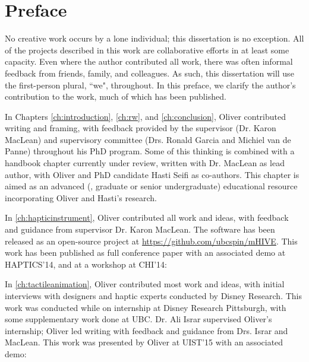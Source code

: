 
\chapter{Preface}
No creative work occurs by a lone individual; this dissertation is no exception.
All of the projects described in this work are collaborative efforts in at least some capacity.
Even where the author contributed all work, there was often informal feedback from friends, family, and colleagues.
As such, this dissertation will use the first-person plural, ``we", throughout.
In this preface, we clarify the author's contribution to the work, much of which has been published.

In Chapters \ref{ch:introduction}, \ref{ch:rw}, and \ref{ch:conclusion}, Oliver contributed writing and framing, with feedback provided by the supervisor (Dr. Karon MacLean) and supervisory committee (Drs. Ronald Garcia and Michiel van de Panne) throughout his PhD program. 
Some of this thinking  is combined with a handbook chapter currently under review, written with Dr. MacLean as lead author, with Oliver and PhD candidate Hasti Seifi as co-authors.
This chapter is aimed as an advanced (\ie, graduate or senior undergraduate) educational resource incorporating Oliver and Hasti's research.

In \autoref{ch:hapticinstrument}, Oliver contributed all work and ideas, with feedback and guidance from supervisor Dr. Karon MacLean.
The software has been released as an open-source project at \url{https://github.com/ubcspin/mHIVE}.
This work has been published as full conference paper with an associated demo at HAPTICS'14, and at a workshop at CHI'14:


\noindent
In \autoref{ch:tactileanimation}, Oliver contributed most work and ideas, with initial interviews with designers and haptic experts conducted by Disney Research.
This work was conducted while on internship at Disney Research Pittsburgh, with some supplementary work done at UBC.
Dr. Ali Israr supervised Oliver's internship; Oliver led writing with feedback and guidance from Drs. Israr and MacLean.
This work was presented by Oliver at UIST'15 with an associated demo:

